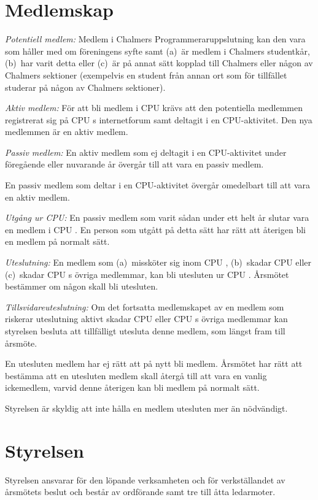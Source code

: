 \documentclass[a4paper]{article}
\makeatletter
\newif\iffullCPU
\def\CPU{%
	\iffullCPU%
		\fullCPUfalse%
		Chalmers Programmeraruppslutning\xspace%
	\else%
		CPU\xspace%
	\fi%
}
\newcommand\countparagraphs{%
	\everypar{%
		\@nobreakfalse%
		\addtocounter{paragraph}{1}%
		\hspace{-4em}%
		\makebox[3em][r]{\small\theparagraph}%
		\hspace{1em}%
		\fullCPUtrue
	}%
}
\renewcommand\theparagraph{\textparagraph\,\arabic{paragraph}}
\let\oldsection\section
\renewcommand\section[1]{%
	\everypar{}%
	\oldsection{#1}\vspace{-1em}%
	\countparagraphs%
	\fullCPUtrue%
}
\makeatother
\begin{document}
\section{Medlemskap}

\emph{Potentiell medlem:} Medlem i \CPU kan den vara som håller med om föreningens syfte samt (a)~är medlem i Chalmers studentkår, (b)~har varit detta eller (c)~är på annat sätt kopplad till Chalmers eller någon av Chalmers sektioner (exempelvis en student från annan ort som för tillfället studerar på någon av Chalmers sektioner).

\emph{Aktiv medlem:} För att bli medlem i \CPU krävs att den potentiella medlemmen registrerat sig på \CPU{s} internetforum samt deltagit i en CPU-aktivitet. Den nya medlemmen är en aktiv medlem.

\emph{Passiv medlem:} En aktiv medlem som ej deltagit i en CPU-aktivitet under föregående eller nuvarande år övergår till att vara en passiv medlem.

En passiv medlem som deltar i en CPU-aktivitet övergår omedelbart till att vara en aktiv medlem.

\emph{Utgång ur CPU:} En passiv medlem som varit sådan under ett helt år slutar vara en medlem i \CPU. En person som utgått på detta sätt har rätt att återigen bli en medlem på normalt sätt.

\emph{Uteslutning:} En medlem som (a)~missköter sig inom \CPU, (b)~skadar \CPU eller (c)~skadar \CPU{s} övriga medlemmar, kan bli utesluten ur \CPU. Årsmötet bestämmer om någon skall bli utesluten.

\emph{Tillsvidareuteslutning:} Om det fortsatta medlemskapet av en medlem som riskerar uteslutning aktivt skadar \CPU eller \CPU{s} övriga medlemmar kan styrelsen besluta att tillfälligt utesluta denne medlem, som längst fram till årsmöte.

En utesluten medlem har ej rätt att på nytt bli medlem. Årsmötet har rätt att bestämma att en utesluten medlem skall återgå till att vara en vanlig ickemedlem, varvid denne återigen kan bli medlem på normalt sätt.

Styrelsen är skyldig att inte hålla en medlem utesluten mer än nödvändigt.

\section{Styrelsen}

Styrelsen ansvarar för den löpande verksamheten och för verkställandet av årsmötets beslut och består av ordförande samt tre till åtta ledarmoter.
\end{document}
